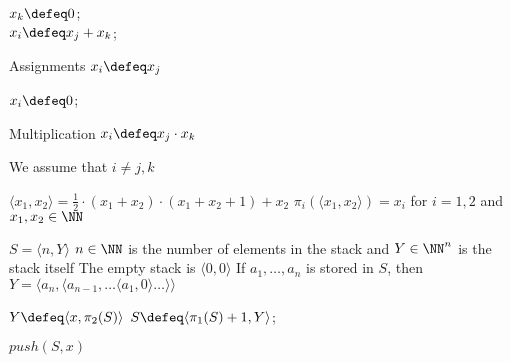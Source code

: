     
        \begin{multicols}{2}
            \begin{pseudo}
                $x_k \defeq 0$;\\
                $x_i \defeq x_j + x_k$;
                \caption{Assignments $x_i \defeq x_j$}
            \end{pseudo}
        \end{multicols}

        \begin{multicols}{2}
            \begin{pseudo}
                $x_i \defeq 0$;\\
                \caption{Multiplication $x_i \defeq x_j \cdot x_k$}
            \end{pseudo}
        \end{multicols}
        We assume that $i \neq j,k$
    
        $\langle x_1, x_2 \rangle = \frac{1}{2} \cdot \left( x_1 + x_2 \right) \cdot \left( x_1 + x_2 + 1 \right) + x_2$\newline
        $\pi_i \left( \langle x_1, x_2 \rangle \right) = x_i$ for $i = 1,2$ and $x_1, x_2 \in \NN$\newline


    \newpage

        $S = \langle n, Y \rangle$\newline
        $n \in \NN$ is the number of elements in the stack and $Y \in \NN^n$ is the stack itself\newline
        The empty stack is $\langle 0, 0 \rangle$\newline
        If $a_1, \ldots, a_n$ is stored in $S$, then $Y = \langle a_n, \langle a_{n-1}, \ldots \langle a_1, 0 \rangle \ldots \rangle \rangle$\newline

        \begin{multicols}{2}
            \begin{pseudo}
                $Y \defeq \langle x, \pi_2(S) \rangle$\;
                $S \defeq \langle \pi_1(S) + 1, Y \rangle$;
                \caption{$push \left( S, x \right)$}
            \end{pseudo}
        \end{multicols}

